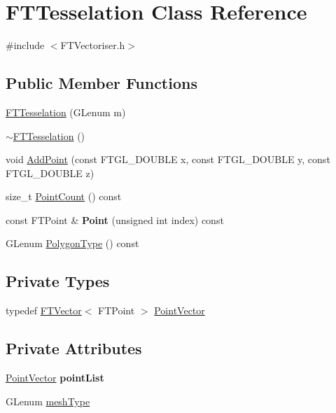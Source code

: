 \hypertarget{class_f_t_tesselation}{}\section{F\+T\+Tesselation Class Reference}
\label{class_f_t_tesselation}


{\ttfamily \#include $<$F\+T\+Vectoriser.\+h$>$}

\subsection*{Public Member Functions}
\begin{DoxyCompactItemize}
\item 
\hyperlink{class_f_t_tesselation_a8ae81852ffa0dfb1bc65e85dc6d35df2}{F\+T\+Tesselation} (G\+Lenum m)
\item 
\hyperlink{class_f_t_tesselation_a55bd008edbf969720fa3dc083bce1ac0}{$\sim$\+F\+T\+Tesselation} ()
\item 
void \hyperlink{class_f_t_tesselation_a204a9e646cee25f374faad125d71d5e6}{Add\+Point} (const F\+T\+G\+L\+\_\+\+D\+O\+U\+B\+LE x, const F\+T\+G\+L\+\_\+\+D\+O\+U\+B\+LE y, const F\+T\+G\+L\+\_\+\+D\+O\+U\+B\+LE z)
\item 
size\+\_\+t \hyperlink{class_f_t_tesselation_aa3cb26a53c3534576339f946acdc0cc7}{Point\+Count} () const 
\item 
const F\+T\+Point \& {\bfseries Point} (unsigned int index) const \hypertarget{class_f_t_tesselation_a964ae8f16f216ca545f44a087f31e827}{}\label{class_f_t_tesselation_a964ae8f16f216ca545f44a087f31e827}

\item 
G\+Lenum \hyperlink{class_f_t_tesselation_a06c290061a75bad0d38a2d5b2f6b09a1}{Polygon\+Type} () const 
\end{DoxyCompactItemize}
\subsection*{Private Types}
\begin{DoxyCompactItemize}
\item 
typedef \hyperlink{class_f_t_vector}{F\+T\+Vector}$<$ F\+T\+Point $>$ \hyperlink{class_f_t_tesselation_aa94c1d146fb81cba45b368bb801a4afb}{Point\+Vector}
\end{DoxyCompactItemize}
\subsection*{Private Attributes}
\begin{DoxyCompactItemize}
\item 
\hyperlink{class_f_t_tesselation_aa94c1d146fb81cba45b368bb801a4afb}{Point\+Vector} {\bfseries point\+List}\hypertarget{class_f_t_tesselation_a3aa378129594220d4ae7aac4f2940bbe}{}\label{class_f_t_tesselation_a3aa378129594220d4ae7aac4f2940bbe}

\item 
G\+Lenum \hyperlink{class_f_t_tesselation_a4c18c7719f352d2b285a9f4924f11438}{mesh\+Type}
\end{DoxyCompactItemize}


